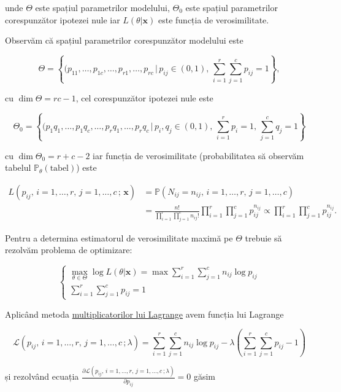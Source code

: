 \documentclass[]{article}
\begin{document}
unde \(\Theta\) este spațiul parametrilor modelului, \(\Theta_0\) este
spațiul parametrilor corespunzător ipotezei nule iar
\(L(\theta|\mathbf{x})\) este funcția de verosimilitate.

Observăm că spațiul parametrilor corespunzător modelului este

\[
\Theta = \left\{(p_{11},\ldots, p_{1c},\ldots, p_{r1},\ldots,p_{rc}\,|\,p_{ij}\in(0,1),\,\sum_{i = 1}^{r}\sum_{j = 1}^{c}p_{ij} = 1\right\},
\]

cu \(\dim{\Theta} = rc-1\), cel corespunzător ipotezei nule este

\[
\Theta_0 = \left\{(p_{1}q_{1},\ldots, p_{1}q_{c},\ldots, p_{r}q_{1},\ldots,p_{r}q_{c}\,|\,p_{i}, q_{j}\in(0,1),\,\sum_{i = 1}^{r}p_{i} = 1,\, \sum_{j = 1}^{c}q_j = 1\right\}
\]

cu \(\dim{\Theta_0} = r+c-2\) iar funcția de verosimilitate
(probabilitatea să observăm tabelul
\(\mathbb{P}_{\theta}(\text{tabel})\)) este

\begin{align*}
  L(p_{ij},\,i = 1,\ldots, r,\, j = 1,\ldots,c\,;\,\mathbf{x}) &= \mathbb{P}(N_{ij} = n_{ij}, \,i = 1,\ldots, r,\, j = 1,\ldots,c) \\
    &= \frac{n!}{\prod_{i = 1}^{r}\prod_{j = 1}^{c} n_{ij}!}\prod_{i = 1}^{r}\prod_{j = 1}^{c} p_{ij}^{n_{ij}}\propto \prod_{i = 1}^{r}\prod_{j = 1}^{c} p_{ij}^{n_{ij}}.
\end{align*}

Pentru a determina estimatorul de verosimilitate maximă pe \(\Theta\)
trebuie să rezolvăm problema de optimizare:

\[
  \left\{\begin{array}{ll}
    \max_{\theta\in\Theta} \log L(\theta|\mathbf{x}) = \max \sum_{i = 1}^{r}\sum_{j = 1}^{c}n_{ij}\log{p_{ij}}\\
    \sum_{i = 1}^{r}\sum_{j = 1}^{c}p_{ij} = 1
  \end{array}\right.
\]

Aplicând metoda
\href{https://en.wikipedia.org/wiki/Lagrange_multiplier}{multiplicatorilor
lui Lagrange} avem funcția lui Lagrange

\[
\mathcal{L}(p_{ij},\,i = 1,\ldots, r,\, j = 1,\ldots,c\,;\lambda) = \sum_{i = 1}^{r}\sum_{j = 1}^{c}n_{ij}\log{p_{ij}} - \lambda\left(\sum_{i = 1}^{r}\sum_{j = 1}^{c}p_{ij} - 1\right)
\]

și rezolvând ecuația
\(\frac{\partial \mathcal{L}(p_{ij},\,i = 1,\ldots, r,\, j = 1,\ldots,c\,;\lambda)}{\partial p_{ij}} = 0\)
găsim
\end{document}
